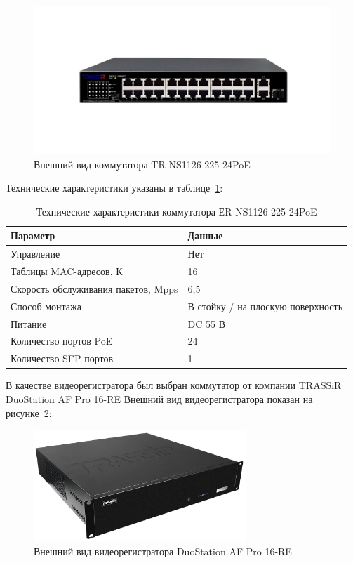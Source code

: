 \begin{figure}[h]
    \begin{center}
        \includegraphics[width=120mm]{images/TR-NS1126-225-24PoE}
    \end{center}
    \captionsetup{justification=centering}
    \caption{Внешний вид коммутатора TR-NS1126-225-24PoE}
    \label{fig::TR-NS1126-225-24PoE}
\end{figure}

Технические характеристики указаны в таблице~\ref{tab::TR-NS1126-225-24PoE-parameters}:
\begin{longtable}{|p{5cm}|p{12cm}|}
    \caption{Технические характеристики коммутатора ЕR-NS1126-225-24PoE}
    \label{tab::TR-NS1126-225-24PoE-parameters} \\

    \hline
    Параметр &
    Данные \\
    \hline
    Управление &
    Нет \\
    \hline
    Таблицы MAC-адресов, К &
    16 \\
    \hline
    Скорость обслуживания пакетов, Mpps &
    6,5 \\
    \hline
    Способ монтажа &
    В стойку / на плоскую поверхность \\
    \hline
    Питание &
    DC 55 В \\
    \hline
    Количество портов PoE &
    24 \\
    \hline
    Количество SFP портов &
    1 \\
    \hline
\end{longtable}

\newpage
В качестве видеорегистратора был выбран коммутатор от компании TRASSiR DuoStation AF Pro 16-RE
Внешний вид видеорегистратора показан на рисунке~\ref{fig::recorder}:

\begin{figure}[h]
    \begin{center}
        \includegraphics[width=80mm]{images/DuoStation AF Pro 16-RE}
    \end{center}
    \captionsetup{justification=centering}
    \caption{Внешний вид видеорегистратора DuoStation AF Pro 16-RE}
    \label{fig::recorder}
\end{figure}

